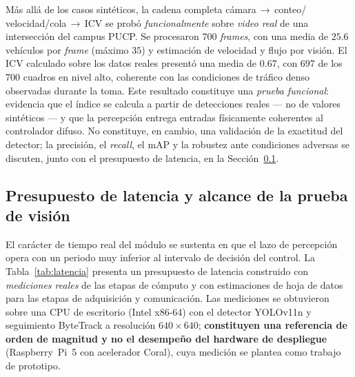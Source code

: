 Más allá de los casos sintéticos, la cadena completa cámara\,$\rightarrow$\,conteo/
velocidad/cola\,$\rightarrow$\,ICV se probó \emph{funcionalmente} sobre \emph{video real} de una
intersección del campus PUCP. Se procesaron $700$ \emph{frames}, con una media de $25.6$
vehículos por \emph{frame} (máximo $35$) y estimación de velocidad y flujo por visión. El ICV
calculado sobre los datos reales presentó una media de $0.67$, con $697$ de los $700$ cuadros en
nivel alto, coherente con las condiciones de tráfico denso observadas durante la toma. Este
resultado constituye una \emph{prueba funcional}: evidencia que el índice se calcula a partir de
detecciones reales --- no de valores sintéticos --- y que la percepción entrega entradas
físicamente coherentes al controlador difuso. No constituye, en cambio, una validación de la
exactitud del detector; la precisión, el \emph{recall}, el mAP y la robustez ante condiciones
adversas se discuten, junto con el presupuesto de latencia, en la
Sección~\ref{subsec:latencia-vision}.

\subsection{Presupuesto de latencia y alcance de la prueba de visión}\label{subsec:latencia-vision}

El carácter de tiempo real del módulo se sustenta en que el lazo de percepción opera con un periodo muy
inferior al intervalo de decisión del control. La Tabla~\ref{tab:latencia} presenta un presupuesto de
latencia construido con \emph{mediciones reales} de las etapas de cómputo y con estimaciones de hoja de datos
para las etapas de adquisición y comunicación. Las mediciones se obtuvieron sobre una CPU de escritorio
(Intel x86-64) con el detector YOLOv11n y seguimiento ByteTrack a resolución $640\times640$;
\textbf{constituyen una referencia de orden de magnitud y no el desempeño del hardware de despliegue}
(Raspberry~Pi~5 con acelerador Coral), cuya medición se plantea como trabajo de prototipo.

